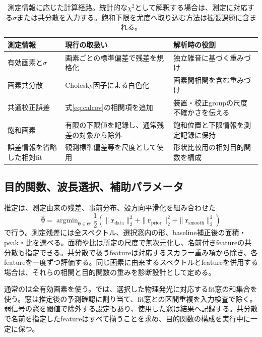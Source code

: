 \begin{table}[htbp]
\centering\small
\begin{tabularx}{\linewidth}{p{35mm}YY}
\toprule
測定情報 & 現行の取扱い & 解析時の役割 \\
\midrule
有効画素と$\sigma$ & 画素ごとの標準偏差で残差を規格化 & 独立雑音に基づく重みづけ \\
画素共分散 & Cholesky因子による白色化 & 画素間相関を含む重みづけ \\
共通校正誤差 & 式\eqref{eq:calcov}の相関項を追加 & 装置・校正groupの尺度不確かさを伝える \\
飽和画素 & 有限の下限値を記録し、通常残差の対象から除外 & 飽和位置と下限情報を測定記録に保持 \\
誤差情報を省略した相対fit & 観測標準偏差等を尺度として使用 & 形状比較用の相対目的関数を構成 \\
\bottomrule
\end{tabularx}
\caption{測定情報に応じた計算経路。統計的な$\chi^2$として解釈する場合は、測定に対応する$\sigma$または共分散を入力する。飽和下限を尤度へ取り込む方法は拡張課題に含まれる。}
\end{table}

\subsection{目的関数、波長選択、補助パラメータ}
推定は、測定由来の残差、事前分布、殻方向平滑化を組み合わせた
\begin{equation}
\widehat{\boldsymbol\theta}=\mathop{\arg\min}_{\boldsymbol\theta\in\Theta}
\frac12\left(\|\boldsymbol r_{\mathrm{data}}\|_2^2+
\|\boldsymbol r_{\mathrm{prior}}\|_2^2+
\|\boldsymbol r_{\mathrm{smooth}}\|_2^2\right)
\label{eq:objective}
\end{equation}
で行う。測定残差には全スペクトル、選択窓内の形、baseline補正後の面積・peak・比を選べる。面積や比は所定の尺度で無次元化し、名前付きfeatureの共分散も指定できる。共分散で扱うfeatureは対応するスカラー重み項から除き、各featureを一度ずつ評価する。同じ画素に由来するスペクトルとfeatureを併用する場合は、それらの相関と目的関数の重みを診断設計として定める。

通常のは全有効画素を使う。では、選択した物理発光に対応するfit窓の和集合を使う。窓は推定後の予測確認に割り当て、fit窓との区間重複を入力検査で除く。弱信号の窓を閾値で除外する設定もあり、使用した窓は結果へ記録する。共分散で名前を指定したfeatureはすべて揃うことを求め、目的関数の構成を実行中に一定に保つ。

